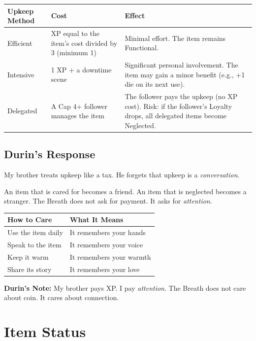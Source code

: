 \documentclass[11pt]{book}
\begin{document}
\begin{table}[h]
\centering
\begin{tabular}{@{}lll@{}}
\toprule
\textbf{Upkeep Method} & \textbf{Cost} & \textbf{Effect} \\
\midrule
Efficient & XP equal to the item's cost divided by 3 (minimum 1) & Minimal effort. The item remains Functional. \\
Intensive & 1 XP + a downtime scene & Significant personal involvement. The item may gain a minor benefit (e.g., +1 die on its next use). \\
Delegated & A Cap 4+ follower manages the item & The follower pays the upkeep (no XP cost). Risk: if the follower's Loyalty drops, all delegated items become Neglected. \\
\bottomrule
\end{tabular}
\end{table}

\subsection*{Durin's Response}

My brother treats upkeep like a tax. He forgets that upkeep is a \textit{conversation}.

An item that is cared for becomes a friend. An item that is neglected becomes a stranger. The Breath does not ask for payment. It asks for \textit{attention}.

\begin{table}[h]
\centering
\begin{tabular}{@{}ll@{}}
\toprule
\textbf{How to Care} & \textbf{What It Means} \\
\midrule
Use the item daily & It remembers your hands \\
Speak to the item & It remembers your voice \\
Keep it warm & It remembers your warmth \\
Share its story & It remembers your love \\
\bottomrule
\end{tabular}
\end{table}

\vspace{0.5cm}
\textbf{Durin's Note:} My brother pays XP. I pay \textit{attention}. The Breath does not care about coin. It cares about connection.

\newpage
\section{Item Status}
\end{document}
